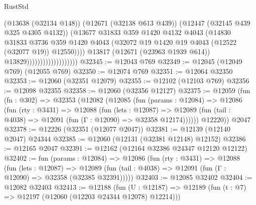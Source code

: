 \begin{lexlean}{RustStd}
\begin{coremodule}
                                            (@13638 (@32134 @148))
                                            (@12671 (@32138 @613 @439))
                                            (@12447 (@32145 @439 @325 @4305 @4132))
                                            (@13677
                                              @31833
                                              @359
                                              @1420
                                              @4132
                                              @4043
                                              (@14830
                                                @31833
                                                @3736
                                                @359
                                                @1420
                                                @4043
                                                (@32072
                                                  @19
                                                  @1420
                                                  @19
                                                  @4043
                                                  (@12522 (@32077 @19))
                                                  @12550))))
                                          @13817
                                          (@12671 (@23963 @1939 @614))
                                          @13829)))))))))))))))))))
@32345 := @12043 @769
@32349 := @12045 (@12049 @769) (@12055 @769)
@32350 := @12074 @769
@32351 := @12064 @32350
@32353 := @12060 (@32351 @12079)
@32355 := @12102 (@12103 @769)
@32356 := @12098 @32355
@32358 := @12060 (@32356 @12127)
@32375 := @12059
    (fun (fn : @302) =>
    @32353
      (@12082
        (@12085
          (fun (params : @12084) =>
          @12086
            (fun (rty : @3431) =>
            @12088
              (fun (lets : @12087) =>
              @12089 (fun (tail : @4038) => @12091 (fun (Γ : @12090) => @32358 @12174))))))
        @12220))
    @2047
@32378 := @12226 (@32351 (@12077 @2047))
@32381 := @12139 (@12140 @2047) @24344
@32385 := @12060 (@12131 (@32381 @12148) @12152)
@32386 := @12165 @2047
@32391 := @12162 (@12164 @32386 @24347 @12120 @12122)
@32402 := fun (params : @12084) =>
  @12086
    (fun (rty : @3431) =>
    @12088
      (fun (lets : @12087) =>
      @12089 (fun (tail : @4038) => @12091 (fun (Γ : @12090) => @32358 (@32385 @32391)))))
@32403 := @12085 @32402
@32404 := @12082 @32403
@32413 := @12188
    (fun (U : @12187) => @12189 (fun (t : @7) => @12197 (@12060 (@12203 @24344 @12078) @12214)))

\end{coremodule}
\end{lexlean}
